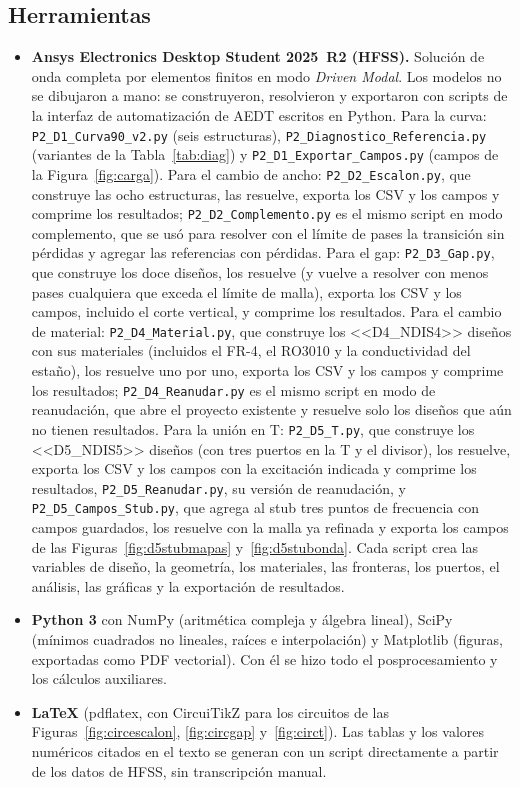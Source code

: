 \documentclass[11pt,letterpaper]{article}
\begin{document}
\subsection{Herramientas}
\begin{itemize}
\item \textbf{Ansys Electronics Desktop Student 2025~R2 (HFSS).} Solución de onda completa por elementos finitos en modo \emph{Driven Modal}. Los modelos no se dibujaron a mano: se construyeron, resolvieron y exportaron con scripts de la interfaz de automatización de AEDT escritos en Python. Para la curva: \texttt{P2\_D1\_Curva90\_v2.py} (seis estructuras), \texttt{P2\_Diagnostico\_Referencia.py} (variantes de la Tabla~\ref{tab:diag}) y \texttt{P2\_D1\_Exportar\_Campos.py} (campos de la Figura~\ref{fig:carga}). Para el cambio de ancho: \texttt{P2\_D2\_Escalon.py}, que construye las ocho estructuras, las resuelve, exporta los CSV y los campos y comprime los resultados; \texttt{P2\_D2\_Complemento.py} es el mismo script en modo complemento, que se usó para resolver con el límite de pases la transición sin pérdidas y agregar las referencias con pérdidas. Para el gap: \texttt{P2\_D3\_Gap.py}, que construye los doce diseños, los resuelve (y vuelve a resolver con menos pases cualquiera que exceda el límite de malla), exporta los CSV y los campos, incluido el corte vertical, y comprime los resultados. Para el cambio de material: \texttt{P2\_D4\_Material.py}, que construye los <<D4_NDIS4>> diseños con sus materiales (incluidos el FR-4, el RO3010 y la conductividad del estaño), los resuelve uno por uno, exporta los CSV y los campos y comprime los resultados; \texttt{P2\_D4\_Reanudar.py} es el mismo script en modo de reanudación, que abre el proyecto existente y resuelve solo los diseños que aún no tienen resultados. Para la unión en T: \texttt{P2\_D5\_T.py}, que construye los <<D5_NDIS5>> diseños (con tres puertos en la T y el divisor), los resuelve, exporta los CSV y los campos con la excitación indicada y comprime los resultados, \texttt{P2\_D5\_Reanudar.py}, su versión de reanudación, y \texttt{P2\_D5\_Campos\_Stub.py}, que agrega al stub tres puntos de frecuencia con campos guardados, los resuelve con la malla ya refinada y exporta los campos de las Figuras~\ref{fig:d5stubmapas} y~\ref{fig:d5stubonda}. Cada script crea las variables de diseño, la geometría, los materiales, las fronteras, los puertos, el análisis, las gráficas y la exportación de resultados.
\item \textbf{Python 3} con NumPy (aritmética compleja y álgebra lineal), SciPy (mínimos cuadrados no lineales, raíces e interpolación) y Matplotlib (figuras, exportadas como PDF vectorial). Con él se hizo todo el posprocesamiento y los cálculos auxiliares.
\item \textbf{\LaTeX} (pdflatex, con CircuiTikZ para los circuitos de las Figuras~\ref{fig:circescalon}, \ref{fig:circgap} y~\ref{fig:circt}). Las tablas y los valores numéricos citados en el texto se generan con un script directamente a partir de los datos de HFSS, sin transcripción manual.
\end{itemize}
\end{document}

